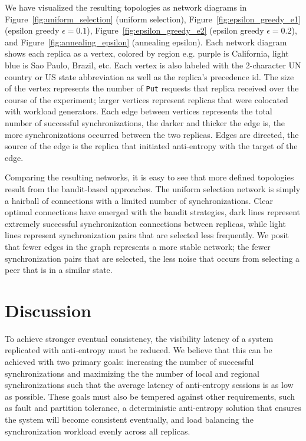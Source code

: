 We have visualized the resulting topologies as network diagrams in
Figure~\ref{fig:uniform_selection} (uniform selection),
Figure~\ref{fig:epsilon_greedy_e1} (epsilon greedy $\epsilon=0.1$),
Figure~\ref{fig:epsilon_greedy_e2} (epsilon greedy $\epsilon=0.2$), and
Figure~\ref{fig:annealing_epsilon} (annealing epsilon).
Each network diagram shows each replica as a vertex, colored by region e.g.
purple is California, light blue is Sao Paulo, Brazil, etc.
Each vertex is also labeled with the 2-character UN country or US state
abbreviation as well as the replica's precedence id.
The size of the vertex represents the number of \texttt{Put} requests that
replica received over the course of the experiment; larger vertices
represent replicas that were colocated with workload generators.
Each edge between vertices represents the total number of successful
synchronizations, the darker and thicker the edge is, the more
synchronizations occurred between the two replicas.
Edges are directed, the source of the edge is the replica that initiated
anti-entropy with the target of the edge.

Comparing the resulting networks, it is easy to see that more defined
topologies result from the bandit-based approaches.
The uniform selection network is simply a hairball of connections with
a limited number of synchronizations.
Clear optimal connections have emerged with the bandit strategies, dark
lines represent extremely successful synchronization connections between
replicas, while light lines represent synchronization pairs that are
selected less frequently.
We posit that fewer edges in the graph represents a more stable network;
the fewer synchronization pairs that are selected, the less noise that
occurs from selecting a peer that is in a similar state.

\section*{Discussion}

To achieve stronger eventual consistency, the visibility latency
of a system replicated with anti-entropy must be reduced.
We believe that this can be achieved with two primary goals: increasing
the number of successful synchronizations and maximizing the the number
of local and regional synchronizations such that the average latency of
anti-entropy sessions is as low as possible.
These goals must also be tempered against other requirements, such as
fault and partition tolerance, a deterministic anti-entropy solution that
ensures the system will become consistent eventually, and load balancing
the synchronization workload evenly across all replicas.

